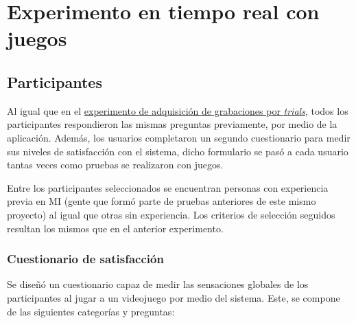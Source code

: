 \chapter{Experimento en tiempo real con juegos}
\label{cap:experimentoTiempoReal}

\section{Participantes}
\label{sec:rt_participantes}

Al igual que en el \hyperref[sec:protocoloAdquisicion]{experimento de
      adquisición de grabaciones por \textit{trials}}, todos los participantes
respondieron las mismas preguntas previamente, por medio de la aplicación.
Además, los usuarios completaron un segundo cuestionario para medir sus niveles
de satisfacción con el sistema, dicho formulario se pasó a cada usuario tantas
veces como pruebas se realizaron con juegos.

Entre los participantes seleccionados se encuentran personas con experiencia
previa en MI (gente que formó parte de pruebas anteriores de este mismo
proyecto) al igual que otras sin experiencia. Los criterios de selección
seguidos resultan los mismos que en el anterior experimento.

\subsection{Cuestionario de satisfacción}
\label{subsec:rt_cuestionario_satisfacción}

Se diseñó un cuestionario capaz de medir las sensaciones globales de los
participantes al jugar a un videojuego por medio del sistema. Este, se compone
de las siguientes categorías y preguntas:

